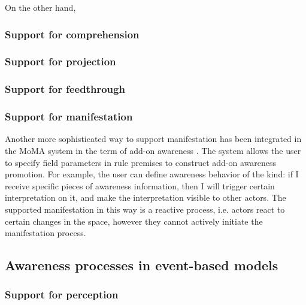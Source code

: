 On the other hand, 

\subsubsection{Support for comprehension} %
\label{ssub:support_for_comprehension}

\subsubsection{Support for projection} %
\label{ssub:support_for_projection}

\subsubsection{Support for feedthrough} %
\label{ssub:support_for_feedthrough}

\subsubsection{Support for manifestation} %
\label{ssub:support_for_manifestation}

Another more sophisticated way to support manifestation has been integrated in the MoMA system in the term of add-on awareness \cite{simone2002a}. The system allows the user to specify field parameters in rule premises to construct add-on awareness promotion. For example, the user can define awareness behavior of the kind: if I receive specific pieces of awareness information, then I will trigger certain interpretation on it, and make the interpretation visible to other actors. The supported manifestation in this way is a reactive process, i.e. actors react to certain changes in the space, however they cannot actively initiate the manifestation process.


\subsection{Awareness processes in event-based models} %
\label{sub:awareness_processes_in_event_based_models}
\subsubsection{Support for perception} %
\label{ssub:support_for_perception}

